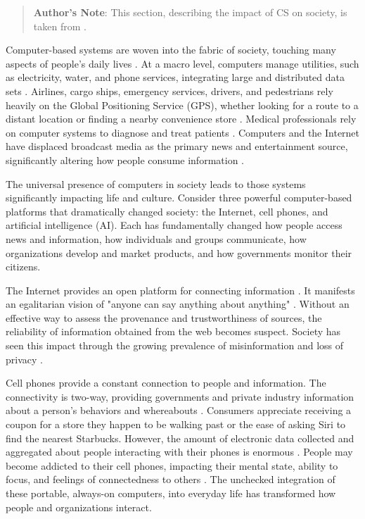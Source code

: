 \begin{quotation}
\textbf{Author's Note}: This section, describing the impact of CS on society, is taken from \cite{read_why_nodate}.
\end{quotation}

Computer-based systems are woven into the fabric of society, touching many aspects of people’s daily lives \parencite{koya_measuring_2020}. At a macro level, computers manage utilities, such as electricity, water, and phone services, integrating large and distributed data sets \parencite{koya_measuring_2020}. Airlines, cargo ships, emergency services, drivers, and pedestrians rely heavily on the Global Positioning Service (GPS), whether looking for a route to a distant location or finding a nearby convenience store \parencite{mcneff_global_2002}. Medical professionals rely on computer systems to diagnose and treat patients \parencite{cirillo_sex_2020}. Computers and the Internet have displaced broadcast media as the primary news and entertainment source, significantly altering how people consume information \parencite{chalaby_television_2016}.

The universal presence of computers in society leads to those systems significantly impacting life and culture. Consider three powerful computer-based platforms that dramatically changed society: the Internet, cell phones, and artificial intelligence (AI). Each has fundamentally changed how people access news and information, how individuals and groups communicate, how organizations develop and market products, and how governments monitor their citizens.

The Internet provides an open platform for connecting information \parencite{berners-lee_world-wide_2010}. It manifests an egalitarian vision of 
"anyone can say anything about anything" \parencite{noauthor_resource_nodate}. Without an effective way to assess the provenance and trustworthiness of sources, the reliability of information obtained from the web becomes suspect. Society has seen this impact through the growing prevalence of misinformation and loss of privacy \parencite{berners-lee_we_2014,zhou_survey_2020}. 

Cell phones provide a constant connection to people and information. The connectivity is two-way, providing governments and private industry information about a person's behaviors and whereabouts \parencite{dienlin_is_2015}. Consumers appreciate receiving a coupon for a store they happen to be walking past or the ease of asking Siri to find the nearest Starbucks. However, the amount of electronic data collected and aggregated about people interacting with their phones is enormous \parencite{dienlin_is_2015}. People may become addicted to their cell phones, impacting their mental state, ability to focus, and feelings of connectedness to others \parencite{de-sola_gutierrez_cell-phone_2016}. The unchecked integration of these portable, always-on computers, into everyday life has transformed how people and organizations interact.

